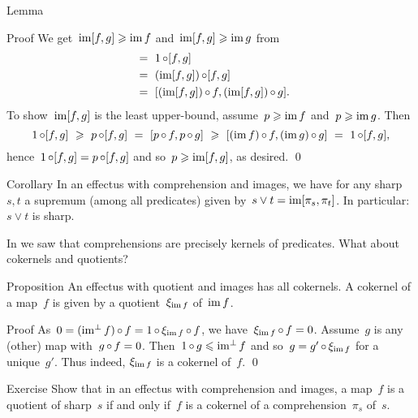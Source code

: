 \documentclass[b]{subfiles}
\begin{document}
\begin{parsec}
\begin{point}{Lemma}
\begin{point}{Proof}
We get~$\operatorname{im}[f,g] \geqslant \operatorname{im} f$ and~$\operatorname{im}[f,g] \geqslant \operatorname{im}  g$
    from
\begin{align*}
    [1 \after f, 1 \after g] 
        &\ =\  1 \after [f,g]  \\ 
        &\ =\ (\IM [f,g]) \after [f,g] \\
        & \ = \  [(\IM [f,g]) \after f, (\IM [f,g]) \after g].
\end{align*}
To show~$\operatorname{im} [f,g]$ is the least upper-bound,
assume~$p \geqslant \operatorname{im} f$ and~$p \geqslant \operatorname{im} g$.
Then
\begin{equation*}
    1 \mathop{\circ} [f,g] \ \geqslant\ p \mathop{\circ} [f,g] \ =\  [p \mathop{\circ} f, p \mathop{\circ} g]
                    \ \geqslant\  [(\operatorname{im} f) \mathop{\circ} f, (\operatorname{im} g)\mathop{\circ} g]
                    \ = \ 1 \mathop{\circ} [f,g],
\end{equation*}
    hence~$1 \mathop{\circ} [f,g] = p \mathop{\circ} [f,g]$
    and so~$p \geqslant \operatorname{im} [f,g]$, as desired. \qed
\end{point}
\begin{point}{Corollary}%
In an effectus with comprehension and images,
we have for any sharp~$s,t$
    a supremum (among all predicates)
    given by~$s \vee t = \operatorname{im}[\pi_s, \pi_t]$.
    In particular:~$s \vee t$ is sharp.
\end{point}
\end{point}
\end{parsec}

\begin{parsec}%
\begin{point}%
In  we saw that comprehensions
    are precisely kernels of predicates.
What about cokernels and quotients?
\end{point}
\begin{point}{Proposition}%
An effectus with quotient and images has all cokernels.
A cokernel of a map~$f$
    is given by a quotient~$\xi_{\operatorname{im} f}$ of~$\operatorname{im} f$.
\begin{point}{Proof}%
As~$0 = (\operatorname{im^\perp} f) \mathop{\circ} f = 1 \mathop{\circ} \xi_{\operatorname{im} f} \mathop{\circ} f$,
        we have~$\xi_{\operatorname{im} f} \mathop{\circ} f = 0$.
    Assume~$g$ is any (other) map with~$g \mathop{\circ} f = 0$.
Then~$1 \mathop{\circ} g \leqslant \operatorname{im^\perp} f$
    and so~$g = g' \mathop{\circ} \xi_{\operatorname{im} f}$
    for a unique~$g'$.
Thus indeed, $\xi_{\operatorname{im} f}$ is a cokernel of~$f$. \qed
\end{point}
\end{point}
\begin{point}{Exercise}%
Show that in an effectus with comprehension and images,
    a map~$f$ is a quotient of sharp~$s$
    if and only if~$f$ is a cokernel
    of a comprehension~$\pi_s$ of~$s$.
\end{point}
\end{parsec}
\end{document}
